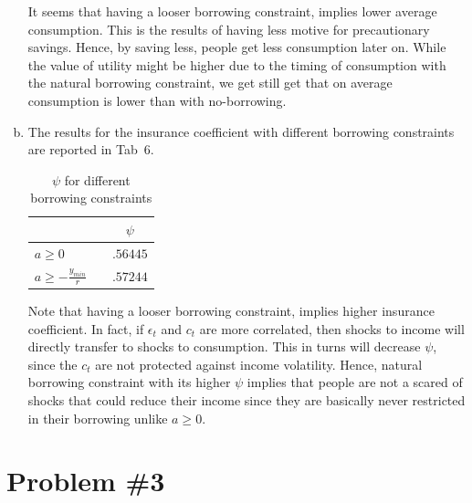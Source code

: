 \documentclass[12pt]{article}
\newcommand{\1}{{\bf 1}} %
\begin{document}
\begin{enumerate}[(a)]
It seems that having a looser borrowing constraint, implies lower average consumption. This is the results of having less motive for precautionary savings. Hence, by saving less, people get less consumption later on. While the value of utility might be higher due to the timing of consumption with the natural borrowing constraint, we get still get that on average consumption is lower than with no-borrowing.

\item

The results for the insurance coefficient with different borrowing constraints are reported in Tab~6.
\begin{table}[H]
	\centering
	\label{tab:tab6}
	\begin{tabular}{@{}llc@{}}
		\toprule
		& &$\psi$    \\ \midrule
		$a\geq0$      &          & $.56445	$               \\
		$a\geq-\frac{y_{min}}{r}$  &             & $.57244$        \\ \bottomrule
	\end{tabular}
	\caption{$\psi$ for different borrowing constraints}
\end{table}
Note that having a looser borrowing constraint, implies higher insurance coefficient. In fact, if $\epsilon_t$ and $c_t$ are more correlated, then shocks to income will directly transfer to shocks to consumption. This in turns will decrease $\psi$, since the $c_t$ are not protected against income volatility. Hence, natural borrowing constraint with its higher $\psi$ implies that people are not a scared of shocks that could reduce their income since they are basically never restricted in their borrowing unlike $a\geq0$.


\end{enumerate}


\section*{Problem \#3}
\end{document}
